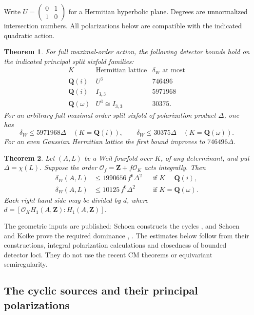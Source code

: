 \documentclass[11pt]{article}
\newtheorem{theorem}{Theorem}[section]
\theoremstyle{definition}
\theoremstyle{remark}
\newcommand{\Q}{\mathbf Q}
\newcommand{\Z}{\mathbf Z}
\begin{document}
Write $U=\left(\begin{smallmatrix}0&1\\1&0\end{smallmatrix}\right)$ for a Hermitian hyperbolic plane. Degrees are unnormalized intersection numbers. All polarizations below are compatible with the indicated quadratic action.

\begin{theorem}\label{thm:sixfold-suppliers}
For full maximal-order action, the following detector bounds hold on the indicated principal split sixfold families:
\[
\begin{array}{lll}
K&\text{Hermitian lattice}&\delta_W\text{ at most}\\
\hline
\Q(i)&U^3&746496\\
\Q(i)&I_{3,3}&5971968\\
\Q(\omega)&U^3\cong I_{3,3}&30375.
\end{array}
\]
For an arbitrary full maximal-order split sixfold of polarization product $\Delta$, one has
\[
 \delta_W\le5971968\Delta\quad(K=\Q(i)),
 \qquad \delta_W\le30375\Delta\quad(K=\Q(\omega)).
\]
For an even Gaussian Hermitian lattice the first bound improves to $746496\Delta$.
\end{theorem}

\begin{theorem}\label{thm:all-determinant-fourfolds}
Let $(A,L)$ be a Weil fourfold over $K$, of any determinant, and put $\Delta=\chi(L)$. Suppose the order $\mathcal O_f=\Z+f\mathcal O_K$ acts integrally. Then
\[
\begin{aligned}
 \delta_W(A,L)&\le1990656\,f^6\Delta^2
 &&\text{if }K=\Q(i),\\
 \delta_W(A,L)&\le10125\,f^6\Delta^2
 &&\text{if }K=\Q(\omega).
\end{aligned}
\]
Each right-hand side may be divided by $d$, where
$d=[\mathcal O_KH_1(A,\Z):H_1(A,\Z)]$.
\end{theorem}

The geometric inputs are published: Schoen constructs the cycles \cite[Theorem~2.0 and \S3]{Schoen88}, and Schoen and Koike prove the required dominance \cite[Lemma~13, pp.~334--335]{Schoen98}, \cite[Theorem~2.1, p.~568]{Koike}. The estimates below follow from their constructions, integral polarization calculations and closedness of bounded detector loci. They do not use the recent CM theorems or equivariant semiregularity.

\subsection{The cyclic sources and their principal polarizations}
\end{document}
